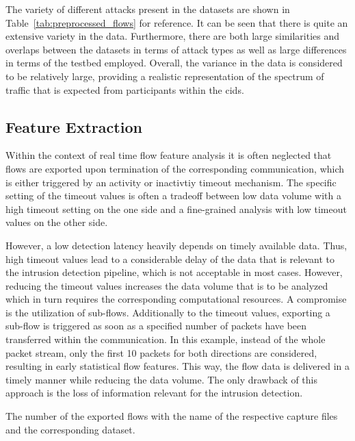 \documentclass[../../main.tex]{subfiles}
\begin{document}
The variety of different attacks present in the datasets are shown in Table~\ref{tab:preprocessed_flows} for reference. It can be seen that there is quite an extensive variety in the data. Furthermore, there are both large similarities and overlaps between the datasets in terms of attack types as well as large differences in terms of the testbed employed. Overall, the variance in the data is considered to be relatively large, providing a realistic representation of the spectrum of traffic that is expected from participants within the \gls{cids}.

\subsection{Feature Extraction}\label{subsec:feature_extraction}

 Within the context of real time flow feature analysis it is often neglected that flows are exported upon termination of the corresponding communication, which is either triggered by an activity or inactivtiy timeout mechanism. The specific setting of the timeout values is often a tradeoff between low data volume with a high timeout setting on the one side and a fine-grained analysis with low timeout values on the other side. 
 
 However, a low detection latency heavily depends on timely available data. Thus, high timeout values lead to a considerable delay of the data that is relevant to the intrusion detection pipeline, which is not acceptable in most cases. However, reducing the timeout values increases the data volume that is to be analyzed which in turn requires the corresponding computational resources. A compromise is the utilization of sub-flows. Additionally to the timeout values, exporting a sub-flow is triggered as soon as a specified number of packets have been transferred within the communication. In this example, instead of the whole packet stream, only the first 10 packets for both directions are considered, resulting in early statistical flow features. This way, the flow data is delivered in a timely manner while reducing the data volume. The only drawback of this approach is the loss of information relevant for the intrusion detection. 

\begin{table}[t]
    \centering
    \footnotesize
    \centering
    \setlength{\extrarowheight}{0pt}
    \addtolength{\extrarowheight}{\aboverulesep}
    \addtolength{\extrarowheight}{\belowrulesep}
    \setlength{\aboverulesep}{0pt}
    \setlength{\belowrulesep}{0pt}
    \setlength{\extrarowheight}{.1em}
    
    \caption[Exported Flows]{The number of the exported flows with the name of the respective capture files and the corresponding dataset.}
    \label{tab:num_exported_flows}
\end{table}
\end{document}
